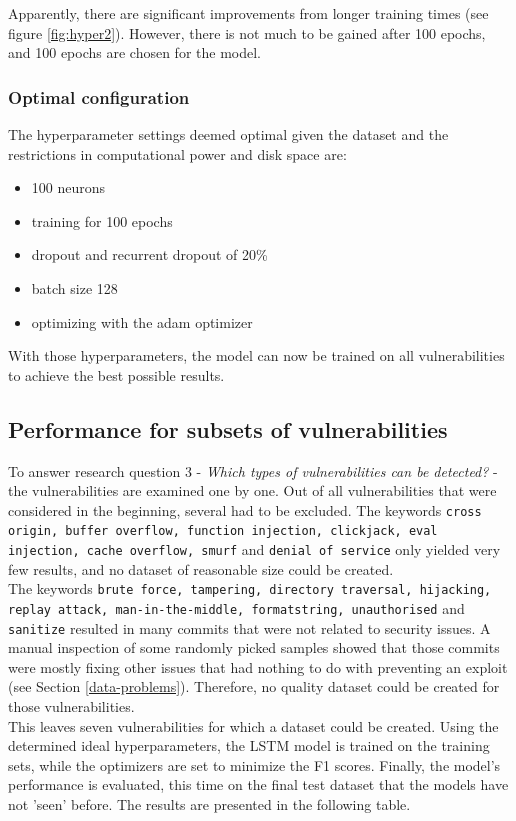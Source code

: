 \documentclass[
a4paper,
pagesize,
pdftex,
12pt,
ngerman,
fleqn,
final,
]{scrartcl}
\begin{document}
	Apparently, there are significant improvements from longer training times (see figure \ref{fig:hyper2}). However, there is not much to be gained after 100 epochs, and 100 epochs are chosen for the model.
	
	\subsubsection{Optimal configuration}
	
	The hyperparameter settings deemed optimal given the dataset and the restrictions in computational power and disk space are:
	\begin{itemize}
		\item 100 neurons
		\item training for 100 epochs
		\item dropout and recurrent dropout of 20\%
		\item batch size 128
		\item optimizing with the adam optimizer
	\end{itemize}
	With those hyperparameters, the model can now be trained on all vulnerabilities to achieve the best possible results.
	
	
	
	\subsection{Performance for subsets of vulnerabilities}\label{vulnerabilities}
	
	To answer research question 3 - \textit{Which types of vulnerabilities can be detected?} - the vulnerabilities are examined one by one. Out of all vulnerabilities that were considered in the beginning, several had to be excluded. The keywords \texttt{cross origin, buffer overflow, function injection, clickjack, eval injection, cache overflow, smurf} and \texttt{denial of service} only yielded very few results, and no dataset of reasonable size could be created.\\
	The keywords \texttt{brute force, tampering, directory traversal, hijacking, replay attack, man-in-the-middle, formatstring, unauthorised} and \texttt{sanitize} resulted in many commits that were not related to security issues. A manual inspection of some randomly picked samples showed that those commits were mostly fixing other issues that had nothing to do with preventing an exploit (see Section \ref{data-problems}). Therefore, no quality dataset could be created for those vulnerabilities.\\
	This leaves seven vulnerabilities for which a dataset could be created. Using the determined ideal hyperparameters, the LSTM model is trained on the training sets, while the optimizers are set to minimize the F1 scores. Finally, the model's performance is evaluated, this time on the final test dataset that the models have not 'seen' before. The results are presented in the following table. 
	
\end{document}
